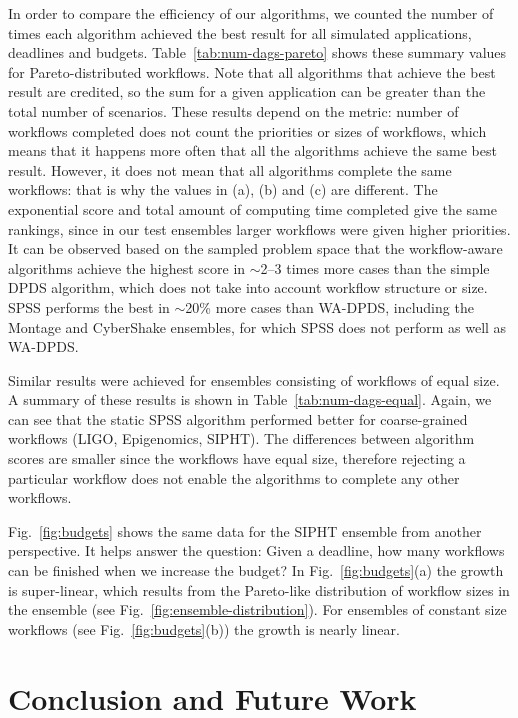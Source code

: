 \documentclass{sig-alternate}
\begin{document}
In order to compare the efficiency of our algorithms, we counted the number of times
each algorithm achieved the best result for all simulated applications, deadlines
and budgets. Table~\ref{tab:num-dags-pareto} shows these summary values for 
Pareto-distributed workflows. Note that all algorithms that achieve the best 
result are credited, so the sum for a given application can be greater than the
total number of scenarios. These results depend on the metric: number of
workflows completed does not count the priorities or sizes of workflows, which
means that it happens more often that all the algorithms achieve the same best
result. However, it does not mean that all algorithms complete the same
workflows: that is why the values in (a), (b) and (c) are different. The 
exponential score and total amount of computing time completed give the same
rankings, since in our test ensembles larger workflows were given higher
priorities. It can be observed based on the sampled problem space that the
workflow-aware algorithms achieve the highest score in $\sim$2--3 times more 
cases than the simple DPDS algorithm, which does not take into account workflow 
structure or size. SPSS performs the best in $\sim$20\% more cases than WA-DPDS,
including the Montage and CyberShake ensembles, for which SPSS does not 
perform as well as WA-DPDS.

Similar results were achieved for ensembles consisting of workflows of equal
size. A summary of these results is shown in Table~\ref{tab:num-dags-equal}.
Again, we can see that the static SPSS algorithm performed better for coarse-grained
workflows (LIGO, Epigenomics, SIPHT). The differences between algorithm scores
are smaller since the workflows have equal size, therefore rejecting a particular
workflow does not enable the algorithms to complete any other workflows.

Fig.~\ref{fig:budgets} shows the same data for the SIPHT ensemble from another
perspective. It helps answer the question: Given a deadline, how many workflows
can be finished when we increase the budget? In Fig.~\ref{fig:budgets}(a) the
growth is super-linear, which results from the Pareto-like distribution of 
workflow sizes in the ensemble (see Fig.~\ref{fig:ensemble-distribution}). 
For ensembles of constant size workflows (see Fig.~\ref{fig:budgets}(b)) 
the growth is nearly linear.



\section{Conclusion and Future Work}
\label{sec:conclusions}
\end{document}
